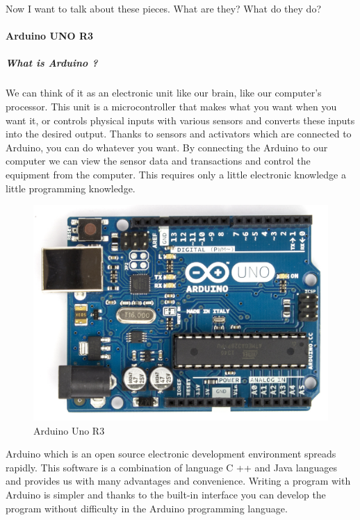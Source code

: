 \documentclass[11pt]{article}
\begin{document}
\begin{flushleft}
Now I want to talk about these pieces. What are they? What do they do?
\end{flushleft}

\vspace{0.3cm}

\paragraph{Arduino UNO R3}
\subparagraph*{What is Arduino ?}
\begin{flushleft}
We can think of it as an electronic unit like our brain, like our computer’s processor. This unit is a microcontroller that makes what you want when you want it, or controls physical inputs with various sensors and converts these inputs into the desired output. Thanks to sensors and activators which are connected to Arduino, you can do whatever you want. By connecting the Arduino to our computer we can view the sensor data and transactions and control the equipment from the computer. This requires only a little electronic knowledge a
little programming knowledge.\\
\vspace{0.2cm}
\begin{figure}[h]
\centering
\includegraphics[scale=.25]{arduino.png}
\caption{Arduino Uno R3}
\end{figure}
\vspace{0.2cm}
Arduino which is an open source electronic development environment spreads rapidly. This software is a combination of language C ++ and Java languages and provides us with many advantages and convenience. Writing a program with Arduino is simpler and thanks to the built-in interface you can develop the program without difficulty in the Arduino programming language.
\end{flushleft}
\end{document}

